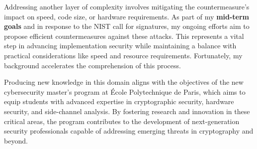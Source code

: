 \documentclass[11pt, a4paper]{article}
\begin{document}
Addressing another layer of complexity involves mitigating the countermeasure's impact on speed, code size, or hardware requirements. As part of my \textbf{mid-term goals} and in response to the NIST call for signatures, my ongoing efforts aim to propose efficient countermeasures against these attacks. This represents a vital step in advancing implementation security while maintaining a balance with practical considerations like speed and resource requirements. Fortunately, my background accelerates the comprehension of this process.





Producing new knowledge in this domain aligns with the objectives of the new cybersecurity 
master's program at École Polytechnique de Paris, which aims to equip students with advanced 
expertise in cryptographic security, hardware security, and side-channel analysis. By fostering 
research and innovation in these critical areas, the program contributes to the development of 
next-generation security professionals capable of addressing emerging threats in cryptography 
and beyond.
\end{document}
